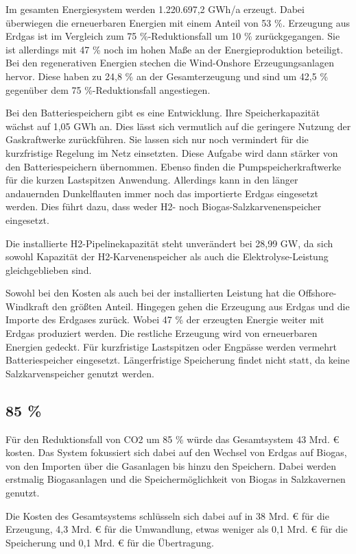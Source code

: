 Im gesamten Energiesystem werden 1.220.697,2 GWh/a erzeugt. Dabei überwiegen die erneuerbaren Energien mit einem Anteil von 53 \%. Erzeugung aus Erdgas ist im Vergleich zum 75 \%-Reduktionsfall um 10 \% zurückgegangen. Sie ist allerdings mit 47 \% noch im hohen Maße an der Energieproduktion beteiligt. Bei den regenerativen Energien stechen die Wind-Onshore Erzeugungsanlagen hervor. Diese haben zu 24,8 \% an der Gesamterzeugung und sind um 42,5 \% gegenüber dem 75 \%-Reduktionsfall angestiegen. 

Bei den Batteriespeichern gibt es eine Entwicklung. Ihre Speicherkapazität wächst auf 1,05 GWh an. Dies lässt sich vermutlich auf die geringere Nutzung der Gaskraftwerke zurückführen. Sie lassen sich nur noch vermindert für die kurzfristige Regelung im Netz einsetzten. Diese Aufgabe wird dann stärker von den Batteriespeichern übernommen. Ebenso finden die Pumpspeicherkraftwerke für die kurzen Lastspitzen Anwendung. Allerdings kann in den länger andauernden Dunkelflauten immer noch das importierte Erdgas eingesetzt werden. Dies führt dazu, dass weder H2- noch Biogas-Salzkarvenenspeicher eingesetzt. 

Die installierte H2-Pipelinekapazität steht unverändert bei 28,99 GW, da sich sowohl Kapazität der H2-Karvenenspeicher als auch die Elektrolyse-Leistung gleichgeblieben sind.

Sowohl bei den Kosten als auch bei der installierten Leistung hat die Offshore-Windkraft den größten Anteil. Hingegen gehen die Erzeugung aus Erdgas und die Importe des Erdgases zurück. Wobei 47 \% der erzeugten Energie weiter mit Erdgas produziert werden. Die restliche Erzeugung wird von erneuerbaren Energien gedeckt. Für kurzfristige Lastspitzen oder Engpässe werden vermehrt Batteriespeicher eingesetzt. Längerfristige Speicherung findet nicht statt, da keine Salzkarvenspeicher genutzt werden.


\subsection{85 \%}
Für den Reduktionsfall von CO2 um 85 \% würde das Gesamtsystem 43 Mrd. € kosten. Das System fokussiert sich dabei auf den Wechsel von Erdgas auf Biogas, von den Importen über die Gasanlagen bis hinzu den Speichern. Dabei werden erstmalig Biogasanlagen und die Speichermöglichkeit von Biogas in Salzkavernen genutzt.

Die Kosten des Gesamtsystems schlüsseln sich dabei auf in 38 Mrd. € für die Erzeugung, 4,3 Mrd. € für die Umwandlung, etwas weniger als 0,1 Mrd. € für die Speicherung und 0,1 Mrd. € für die Übertragung.

